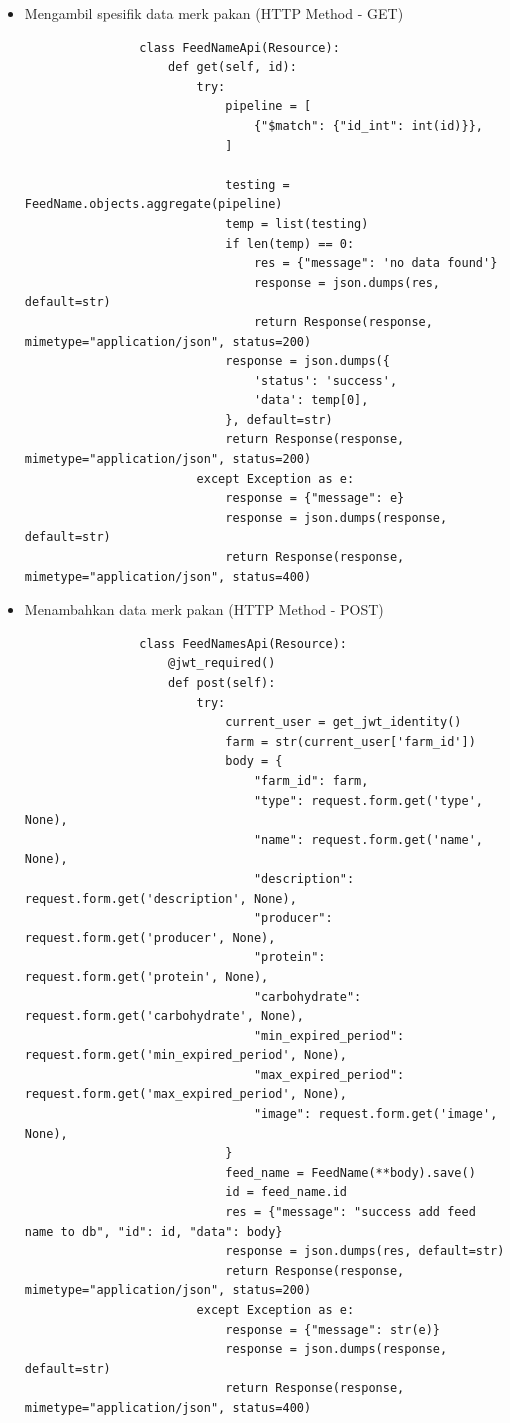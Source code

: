 \begin{spacing}{1.5}
\begin{enumerate}
\begin{itemize}
			\item Mengambil spesifik data merk pakan (HTTP Method - GET)
			
			\begin{lstlisting}
				class FeedNameApi(Resource):
					def get(self, id):
						try:
							pipeline = [
								{"$match": {"id_int": int(id)}},
							]
					
							testing = FeedName.objects.aggregate(pipeline)
							temp = list(testing)
							if len(temp) == 0:
								res = {"message": 'no data found'}
								response = json.dumps(res, default=str)
								return Response(response, mimetype="application/json", status=200)
							response = json.dumps({
								'status': 'success',
								'data': temp[0],
							}, default=str)
							return Response(response, mimetype="application/json", status=200)
						except Exception as e:
							response = {"message": e}
							response = json.dumps(response, default=str)
							return Response(response, mimetype="application/json", status=400)
			\end{lstlisting}

			\item Menambahkan data merk pakan (HTTP Method - POST)
			
			\begin{lstlisting}
				class FeedNamesApi(Resource):
					@jwt_required()
					def post(self):
						try:
							current_user = get_jwt_identity()
							farm = str(current_user['farm_id'])
							body = {
								"farm_id": farm,
								"type": request.form.get('type', None),
								"name": request.form.get('name', None),
								"description": request.form.get('description', None),
								"producer": request.form.get('producer', None),
								"protein": request.form.get('protein', None),
								"carbohydrate": request.form.get('carbohydrate', None),
								"min_expired_period": request.form.get('min_expired_period', None),
								"max_expired_period": request.form.get('max_expired_period', None),
								"image": request.form.get('image', None),
							}
							feed_name = FeedName(**body).save()
							id = feed_name.id
							res = {"message": "success add feed name to db", "id": id, "data": body}
							response = json.dumps(res, default=str)
							return Response(response, mimetype="application/json", status=200)
						except Exception as e:
							response = {"message": str(e)}
							response = json.dumps(response, default=str)
							return Response(response, mimetype="application/json", status=400)
			\end{lstlisting}


\end{itemize}
\end{enumerate}
\end{spacing}
